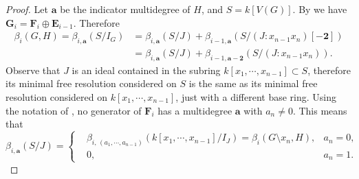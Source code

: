 \documentclass[dvipsnames,10pt]{article}
\begin{document}
\begin{proof}
    Let $\mathbf{a}$ be the indicator multidegree of $H$, and $S=k[V(G)]$. By  we have $\mathbf{G}_i=\mathbf{F}_i\oplus \mathbf{E}_{i-1}$. Therefore
    \begin{align}
        \beta_i(G,H) = \beta_{i,\mathbf{a}}(S/I_G) &= \beta_{i,\mathbf{a}}(S/J) + \beta_{i-1,\mathbf{a}}(S/(J:x_{n-1}x_n)[-\mathbf{2}])\\
        &= \beta_{i,\mathbf{a}}(S/J) + \beta_{i-1,\mathbf{a}-\mathbf{2}}(S/(J:x_{n-1}x_n)).
    \end{align}
    Observe that $J$ is an ideal contained in the subring $k[x_1,\cdots,x_{n-1}]\subset S$, therefore its minimal free resolution considered on $S$ is the same as its minimal free resolution considered on $k[x_1,\cdots,x_{n-1}]$, just with a different base ring. Using the notation of , no generator of $\mathbf{F}_i$ has a multidegree $\mathbf{a}$ with $a_n\neq 0$. This means that
    \begin{equation}
        \beta_{i,\mathbf{a}}(S/J) = \left\{
            \begin{aligned}
                &\beta_{i,\,(a_1,\cdots,a_{n-1})}(k[x_1,\cdots,x_{n-1}]/I_J)=\beta_i(G\setminus x_n,H), &a_n=0,\\
                &0, &a_n=1.
            \end{aligned}
        \right.
    \end{equation}


\end{proof}
\end{document}
